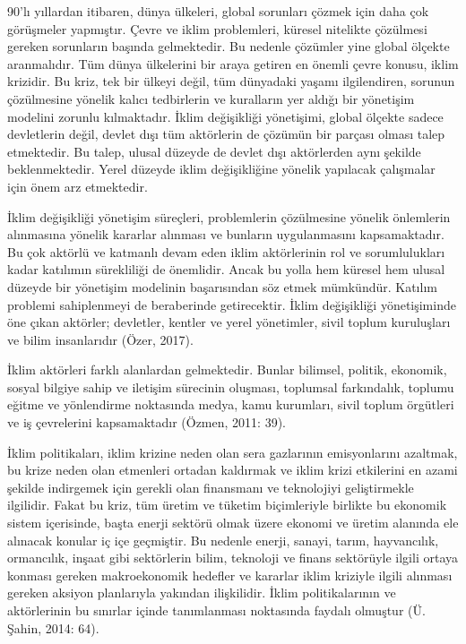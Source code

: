 \documentclass[
]{book}
\begin{document}
90'lı yıllardan itibaren, dünya ülkeleri, global sorunları çözmek için daha çok görüşmeler yapmıştır. Çevre ve iklim problemleri, küresel nitelikte çözülmesi gereken sorunların başında gelmektedir. Bu nedenle çözümler yine global ölçekte aranmalıdır. Tüm dünya ülkelerini bir araya getiren en önemli çevre konusu, iklim krizidir. Bu kriz, tek bir ülkeyi değil, tüm dünyadaki yaşamı ilgilendiren, sorunun çözülmesine yönelik kalıcı tedbirlerin ve kuralların yer aldığı bir yönetişim modelini zorunlu kılmaktadır. İklim değişikliği yönetişimi, global ölçekte sadece devletlerin değil, devlet dışı tüm aktörlerin de çözümün bir parçası olması talep etmektedir. Bu talep, ulusal düzeyde de devlet dışı aktörlerden aynı şekilde beklenmektedir. Yerel düzeyde iklim değişikliğine yönelik yapılacak çalışmalar için önem arz etmektedir.

İklim değişikliği yönetişim süreçleri, problemlerin çözülmesine yönelik önlemlerin alınmasına yönelik kararlar alınması ve bunların uygulanmasını kapsamaktadır. Bu çok aktörlü ve katmanlı devam eden iklim aktörlerinin rol ve sorumlulukları kadar katılımın sürekliliği de önemlidir. Ancak bu yolla hem küresel hem ulusal düzeyde bir yönetişim modelinin başarısından söz etmek mümkündür. Katılım problemi sahiplenmeyi de beraberinde getirecektir. İklim değişikliği yönetişiminde öne çıkan aktörler; devletler, kentler ve yerel yönetimler, sivil toplum kuruluşları ve bilim insanlarıdır (Özer, 2017).

İklim aktörleri farklı alanlardan gelmektedir. Bunlar bilimsel, politik, ekonomik, sosyal bilgiye sahip ve iletişim sürecinin oluşması, toplumsal farkındalık, toplumu eğitme ve yönlendirme noktasında medya, kamu kurumları, sivil toplum örgütleri ve iş çevrelerini kapsamaktadır (Özmen, 2011: 39).

İklim politikaları, iklim krizine neden olan sera gazlarının emisyonlarını azaltmak, bu krize neden olan etmenleri ortadan kaldırmak ve iklim krizi etkilerini en azami şekilde indirgemek için gerekli olan finansmanı ve teknolojiyi geliştirmekle ilgilidir. Fakat bu kriz, tüm üretim ve tüketim biçimleriyle birlikte bu ekonomik sistem içerisinde, başta enerji sektörü olmak üzere ekonomi ve üretim alanında ele alınacak konular iç içe geçmiştir. Bu nedenle enerji, sanayi, tarım, hayvancılık, ormancılık, inşaat gibi sektörlerin bilim, teknoloji ve finans sektörüyle ilgili ortaya konması gereken makroekonomik hedefler ve kararlar iklim kriziyle ilgili alınması gereken aksiyon planlarıyla yakından ilişkilidir. İklim politikalarının ve aktörlerinin bu sınırlar içinde tanımlanması noktasında faydalı olmuştur (Ü. Şahin, 2014: 64).
\end{document}
